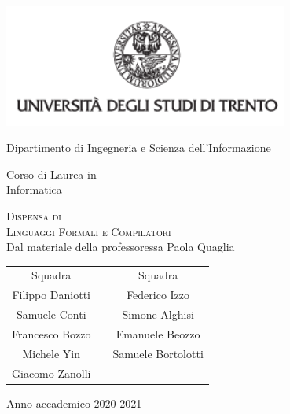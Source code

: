 \documentclass[class=book, crop=false, oneside]{standalone}
\begin{document}
\begin{titlepage}
	\centering
	\includegraphics[width=0.7\textwidth, keepaspectratio]{logo-unitn}

	\vspace{1.3cm}
	\LARGE{Dipartimento di Ingegneria e Scienza dell'Informazione\\}

	\vspace{.9cm}
	\Large{Corso di Laurea in\\ Informatica}

	\vspace{.9cm}
	\Huge\textsc{Dispensa di\\Linguaggi Formali e Compilatori\\}
	\vspace{.2cm}
	\large{Dal materiale della professoressa Paola Quaglia}

	\vspace{1.8cm}
	\begin{tabularx}{\textwidth}{cXc}
		\Large{Squadra} & & \Large{Squadra} \\
		\cmidrule(lr){1-1} \cmidrule(lr){3-3}
		\large{Filippo Daniotti} & & \large{Federico Izzo} \\
		\large{Samuele Conti} & & \large{Simone Alghisi} \\
		\large{Francesco Bozzo} & & \large{Emanuele Beozzo} \\
		\large{Michele Yin} & & \large{Samuele Bortolotti} \\
		\large{Giacomo Zanolli} & & \\
	\end{tabularx}

	\vspace{1.4cm}
	\LARGE{Anno accademico 2020-2021}
\end{titlepage}
\end{document}
